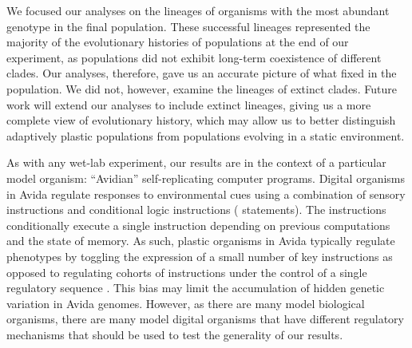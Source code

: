 We focused our analyses on the lineages of organisms with the most abundant genotype in the final population.
These successful lineages represented the majority of the evolutionary histories of populations at the end of our experiment, as populations did not exhibit long-term coexistence of different clades.
Our analyses, therefore, gave us an accurate picture of what fixed in the population.
We did not, however, examine the lineages of extinct clades.
Future work will extend our analyses to include extinct lineages, giving us a more complete view of evolutionary history, which may allow us to better distinguish adaptively plastic populations from populations evolving in a static environment. 

As with any wet-lab experiment, our results are in the context of a particular model organism: ``Avidian'' self-replicating computer programs.
Digital organisms in Avida regulate responses to environmental cues using a combination of sensory instructions and conditional logic instructions ( statements).
The  instructions conditionally execute a single instruction depending on previous computations and the state of memory. 
As such, plastic organisms in Avida typically regulate phenotypes by toggling the expression of a small number of key instructions as opposed to regulating cohorts of instructions under the control of a single regulatory sequence \citep{supplemental_material}. 
This bias may limit the accumulation of hidden genetic variation in Avida genomes. 
However, as there are many model biological organisms, there are many model digital organisms that have different regulatory mechanisms that should be used to test the generality of our results.


